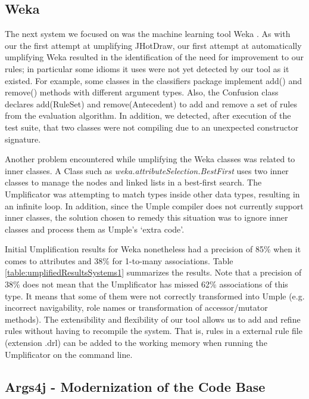 \subsection{Weka}
 
The next system we focused on was the machine learning tool Weka \cite{Weka}. As with our the first attempt at umplifying JHotDraw, our first attempt at automatically umplifying Weka resulted in the identification of the need for improvement to our rules; in particular some idioms it uses were not yet detected by our tool as it existed. For example, some classes in the classifiers package implement add() and remove() methods with different argument types. Also, the Confusion class declares add(RuleSet) and remove(Antecedent) to add and remove a set of rules from the evaluation algorithm. In addition, we detected, after execution of the test suite, that two classes were not compiling due to an unexpected constructor signature.

Another problem encountered while umplifying the Weka classes was related to inner classes. A Class such as \textit{weka.attributeSelection.BestFirst} uses two inner classes to manage the nodes and linked lists in a best-first search. The Umplificator was attempting to match types inside other data types, resulting in an infinite loop. In addition, since the Umple compiler does not currently support inner classes, the solution chosen to remedy this situation was to ignore inner classes and process them as Umple's `extra code'. 

Initial Umplification results for Weka nonetheless had a precision of 85\% when it comes to attributes and 38\% for 1-to-many associations. Table \ref{table:umplifiedResultsSystems1} summarizes the results. Note that a precision of 38\% does not mean that the Umplificator has missed 62\% associations of this type. It means that some of them were not correctly transformed into Umple (e.g. incorrect navigability, role names or transformation of accessor/mutator methods). The extensibility and flexibility of our tool allows us to add and refine rules without having to recompile the system. That is, rules in a external rule file (extension .drl) can be added to the working memory when running the Umplificator on the command line.

\subsection{Args4j - Modernization of the Code Base}

